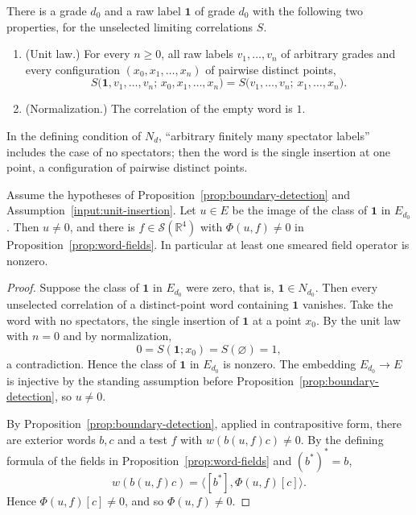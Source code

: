 \begin{assumption}
\label{input:unit-insertion}
There is a grade $d_0$ and a raw label $\mathbf 1$ of grade $d_0$ with the
following two properties, for the unselected limiting correlations $S$.
\begin{enumerate}
\item (Unit law.) For every $n\geq0$, all raw labels $v_1,\ldots,v_n$ of
  arbitrary grades and every configuration $(x_0,x_1,\ldots,x_n)$ of
  pairwise distinct points,
  \[
   S\big(\mathbf 1,v_1,\ldots,v_n;\,x_0,x_1,\ldots,x_n\big)
   =S\big(v_1,\ldots,v_n;\,x_1,\ldots,x_n\big).
  \]
\item (Normalization.) The correlation of the empty word is $1$.
\end{enumerate}
\end{assumption}

In the defining condition of $N_d$, ``arbitrary finitely many spectator
labels'' includes the case of no spectators; then the word is the single
insertion at one point, a configuration of pairwise distinct points.

\begin{corollary}
\label{cor:nonzero-field}
Assume the hypotheses of Proposition~\ref{prop:boundary-detection} and
Assumption~\ref{input:unit-insertion}. Let $u\in E$ be the image of the
class of $\mathbf 1$ in $E_{d_0}$. Then $u\neq0$, and there is
$f\in\mathscr S(\mathbb R^4)$ with $\Phi(u,f)\neq0$ in
Proposition~\ref{prop:word-fields}. In particular at least one smeared
field operator is nonzero.
\end{corollary}
\begin{proof}
Suppose the class of $\mathbf 1$ in $E_{d_0}$ were zero, that is,
$\mathbf 1\in N_{d_0}$. Then every unselected correlation of a
distinct-point word containing $\mathbf 1$ vanishes. Take the word with
no spectators, the single insertion of $\mathbf 1$ at a point $x_0$. By the
unit law with $n=0$ and by normalization,
\[
 0=S(\mathbf 1;x_0)=S(\varnothing)=1,
\]
a contradiction. Hence the class of $\mathbf 1$ in $E_{d_0}$ is nonzero.
The embedding $E_{d_0}\to E$ is injective by the standing assumption
before Proposition~\ref{prop:boundary-detection}, so $u\ne0$.

By Proposition~\ref{prop:boundary-detection}, applied in contrapositive
form, there are exterior words $b,c$ and a test $f$ with
$w(b(u,f)c)\neq0$. By the defining formula of the fields in
Proposition~\ref{prop:word-fields} and $(b^*)^*=b$,
\[
 w(b(u,f)c)=\langle[b^*],\Phi(u,f)[c]\rangle .
\]
Hence $\Phi(u,f)[c]\neq0$, and so $\Phi(u,f)\neq0$.
\end{proof}

